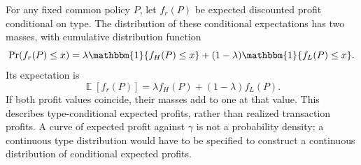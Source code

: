\documentclass[12pt]{article}
\theoremstyle{definition}
\theoremstyle{remark}
\DeclareMathOperator{\E}{\mathbb{E}}
\newcommand{\ind}{\mathbbm{1}}
\numberwithin{equation}{section}
\begin{document}
For any fixed common policy $P$, let $f_r(P)$ be expected discounted profit
conditional on type. The distribution of these conditional expectations has
two masses, with cumulative distribution function
\[
 \Pr(f_r(P)\leq x)
 =\lambda\ind\{f_H(P)\leq x\}
       +(1-\lambda)\ind\{f_L(P)\leq x\}.
\]
Its expectation is
\[
 \E[f_r(P)]=\lambda f_H(P)+(1-\lambda)f_L(P).
\]
If both profit values coincide, their masses add to one at that value.
This describes type-conditional expected profits, rather than realized
transaction profits. A curve of expected profit against $\gamma$ is not a
probability density; a continuous type distribution would have to be specified
to construct a continuous distribution of conditional expected profits.
\end{document}

